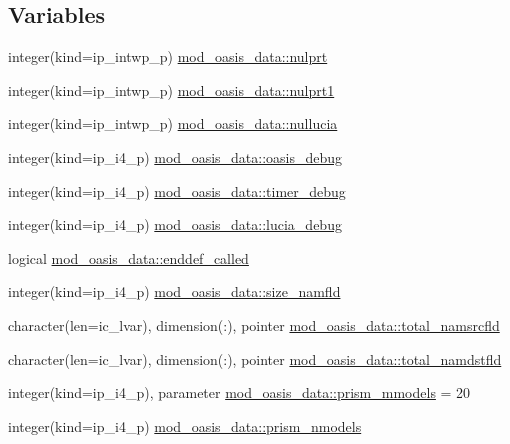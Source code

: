 \subsection*{Variables}
\begin{DoxyCompactItemize}
\item 
integer(kind=ip\+\_\+intwp\+\_\+p) \hyperlink{namespacemod__oasis__data_af0f17b70f48598dac24f2e41ca0da4b2}{mod\+\_\+oasis\+\_\+data\+::nulprt}
\item 
integer(kind=ip\+\_\+intwp\+\_\+p) \hyperlink{namespacemod__oasis__data_a2b9f5c72f10178df0bda39000b151d24}{mod\+\_\+oasis\+\_\+data\+::nulprt1}
\item 
integer(kind=ip\+\_\+intwp\+\_\+p) \hyperlink{namespacemod__oasis__data_a46d81d5ac9efa619628264c5e45bac41}{mod\+\_\+oasis\+\_\+data\+::nullucia}
\item 
integer(kind=ip\+\_\+i4\+\_\+p) \hyperlink{namespacemod__oasis__data_a51f2f4f66476cf893f2507722cd65958}{mod\+\_\+oasis\+\_\+data\+::oasis\+\_\+debug}
\item 
integer(kind=ip\+\_\+i4\+\_\+p) \hyperlink{namespacemod__oasis__data_a320a34357de5c3049ccf102df7b97f5e}{mod\+\_\+oasis\+\_\+data\+::timer\+\_\+debug}
\item 
integer(kind=ip\+\_\+i4\+\_\+p) \hyperlink{namespacemod__oasis__data_a7c427f27ff231565a1ecc0caeb30c67c}{mod\+\_\+oasis\+\_\+data\+::lucia\+\_\+debug}
\item 
logical \hyperlink{namespacemod__oasis__data_a5341a9152ef540667f7fcaa4f04c6399}{mod\+\_\+oasis\+\_\+data\+::enddef\+\_\+called}
\item 
integer(kind=ip\+\_\+i4\+\_\+p) \hyperlink{namespacemod__oasis__data_aa8588b3be582de7f61aa318d45854483}{mod\+\_\+oasis\+\_\+data\+::size\+\_\+namfld}
\item 
character(len=ic\+\_\+lvar), dimension(\+:), pointer \hyperlink{namespacemod__oasis__data_a58b5a440f274f5dfb942d7e18f12674c}{mod\+\_\+oasis\+\_\+data\+::total\+\_\+namsrcfld}
\item 
character(len=ic\+\_\+lvar), dimension(\+:), pointer \hyperlink{namespacemod__oasis__data_a81466361b20004007f221dd6a32041f9}{mod\+\_\+oasis\+\_\+data\+::total\+\_\+namdstfld}
\item 
integer(kind=ip\+\_\+i4\+\_\+p), parameter \hyperlink{namespacemod__oasis__data_a11c61975c048981f7e508f1b6caf16b6}{mod\+\_\+oasis\+\_\+data\+::prism\+\_\+mmodels} = 20
\item 
integer(kind=ip\+\_\+i4\+\_\+p) \hyperlink{namespacemod__oasis__data_a5915b02f461626d5a6cffbf037daa75e}{mod\+\_\+oasis\+\_\+data\+::prism\+\_\+nmodels}

\end{DoxyCompactItemize}
